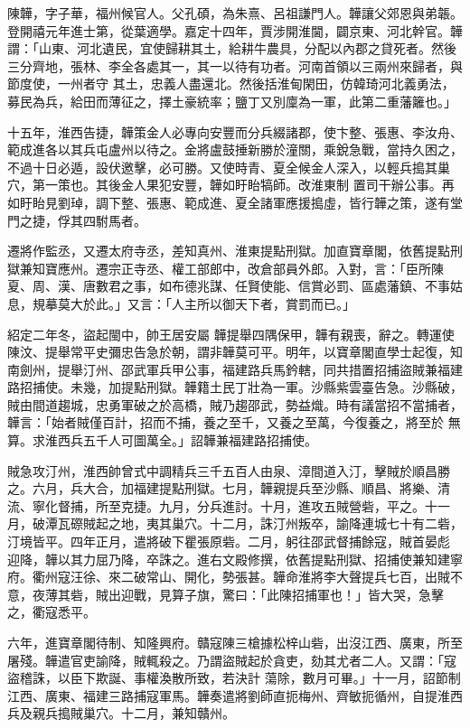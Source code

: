 \begin{pinyinscope}
 陳韡，字子華，福州候官人。父孔碩，為朱熹、呂祖謙門人。韡讓父郊恩與弟韔。登開禧元年進士第，從葉適學。嘉定十四年，賈涉開淮閫，闢京東、河北幹官。韡謂：「山東、河北遺民，宜使歸耕其土，給耕牛農具，分配以內郡之貸死者。然後三分齊地，張林、李全各處其一，其一以待有功者。河南首領以三兩州來歸者，與節度使，一州者守
 其土，忠義人盡還北。然後括淮甸閑田，仿韓琦河北義勇法，募民為兵，給田而薄征之，擇土豪統率；鹽丁又別廩為一軍，此第二重藩籬也。」



 十五年，淮西告捷，韡策金人必專向安豐而分兵綴諸郡，使卞整、張惠、李汝舟、範成進各以其兵屯盧州以待之。金將盧鼓捶新勝於潼關，乘銳急戰，當持久困之，不過十日必遁，設伏邀擊，必可勝。又使時青、夏全候金人深入，以輕兵搗其巢穴，第一策也。其後金人果犯安豐，韡如盱眙犒師。改淮東制
 置司干辦公事。再如盱眙見劉琸，調下整、張惠、範成進、夏全諸軍應援搗虛，皆行韡之策，遂有堂門之捷，俘其四駙馬者。



 遷將作監丞，又遷太府寺丞，差知真州、淮東提點刑獄。加直寶章閣，依舊提點刑獄兼知寶應州。遷宗正寺丞、權工部郎中，改倉部員外郎。入對，言：「臣所陳夏、周、漢、唐數君之事，如布德兆謀、任賢使能、信賞必罰、區處藩鎮、不事姑息，規摹莫大於此。」又言：「人主所以御天下者，賞罰而已。」



 紹定二年冬，盜起閩中，帥王居安屬
 韡提舉四隅保甲，韡有親喪，辭之。轉運使陳汶、提舉常平史彌忠告急於朝，謂非韡莫可平。明年，以寶章閣直學士起復，知南劍州，提舉汀州、邵武軍兵甲公事，福建路兵馬鈐轄，同共措置招捕盜賊兼福建路招捕使。未幾，加提點刑獄。韡籍土民丁壯為一軍。沙縣紫雲臺告急。沙縣破，賊由間道趨城，忠勇軍破之於高橋，賊乃趨邵武，勢益熾。時有議當招不當捕者，韡言：「始者賊僅百計，招而不捕，養之至千，又養之至萬，今復養之，將至於
 無算。求淮西兵五千人可圖萬全。」詔韡兼福建路招捕使。



 賊急攻汀州，淮西帥曾式中調精兵三千五百人由泉、漳間道入汀，擊賊於順昌勝之。六月，兵大合，加福建提點刑獄。七月，韡親提兵至沙縣、順昌、將樂、清流、寧化督捕，所至克捷。九月，分兵進討。十月，進攻五賊營砦，平之。十一月，破潭瓦磜賊起之地，夷其巢穴。十二月，誅汀州叛卒，諭降連城七十有二砦，汀境皆平。四年正月，遣將破下瞿張原砦。二月，躬往邵武督捕餘寇，賊首晏彪
 迎降，韡以其力屈乃降，卒誅之。進右文殿修撰，依舊提點刑獄、招捕使兼知建寧府。衢州寇汪徐、來二破常山、開化，勢張甚。韡命淮將李大聲提兵七百，出賊不意，夜薄其砦，賊出迎戰，見算子旗，驚曰：「此陳招捕軍也！」皆大哭，急擊之，衢寇悉平。



 六年，進寶章閣待制、知隆興府。贛寇陳三槍據松梓山砦，出沒江西、廣東，所至屠殘。韡遣官吏諭降，賊輒殺之。乃謂盜賊起於貪吏，劾其尤者二人。又謂：「寇盜稽誅，以臣下欺誕、事權渙散所致，若決計
 蕩除，數月可畢。」十一月，詔節制江西、廣東、福建三路捕寇軍馬。韡奏遣將劉師直扼梅州、齊敏扼循州，自提淮西兵及親兵搗賊巢穴。十二月，兼知贛州。




\end{pinyinscope}
